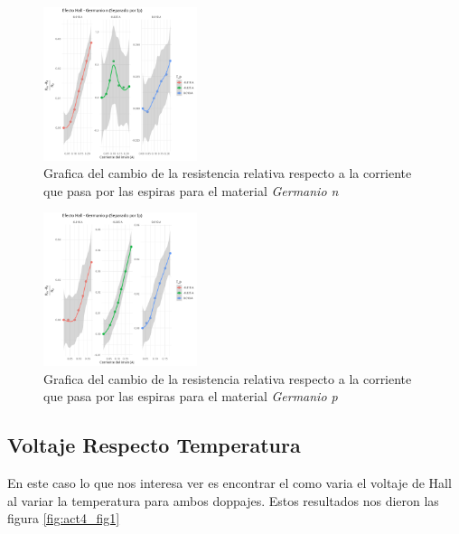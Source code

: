 \documentclass[a4paper, amsfonts, amssymb, amsmath, reprint, showkeys, nofootinbib, twoside]{revtex4-1}
\begin{document}
\begin{figure}
  \begin{center}
    \includegraphics[width=0.4\textwidth]{./img/Act3/R_m_n_I_separado.png}
  \end{center}
  \caption{Grafica del cambio de la resistencia relativa respecto a la corriente que pasa por las espiras para el material \textit{Germanio n}}\label{fig:act3_fig1}
\end{figure}

\begin{figure}
  \begin{center}
    \includegraphics[width=0.4\textwidth]{./img/Act3/R_m_p_I_separado.png}
  \end{center}
  \caption{Grafica del cambio de la resistencia relativa respecto a la corriente que pasa por las espiras para el material \textit{Germanio p}}\label{fig:act3_fig2}
\end{figure}

\subsection{Voltaje Respecto Temperatura}

En este caso lo que nos interesa ver es encontrar el como varia el voltaje de Hall al variar la temperatura para ambos doppajes. Estos resultados nos dieron las figura \ref{fig:act4_fig1}
\end{document}

